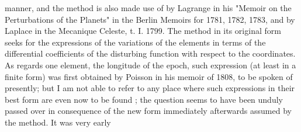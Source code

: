 \documentclass[12pt,a4paper]{article}
\theoremstyle{definition}
\begin{document}
manner, and the method is also made use of by Lagrange in his "Memoir on the
Perturbations of the Planets" in the Berlin Memoirs for 1781, 1782, 1783, and by
Laplace in the Mecanique Celeste, t. I. 1799. The method in its original form
seeks for the expressions of the variations of the elements in terms of the differential
coefficients of the disturbing function with respect to the coordinates. As regards one
element, the longitude of the epoch, such expression (at least in a finite form) was
first obtained by Poisson in his memoir of 1808, to be spoken of presently; but I
am not able to refer to any place where such expressions in their best form are even
now to be found ; the question seems to have been unduly passed over in consequence
of the new form immediately afterwards assumed by the method. It was very early


\end{document}
